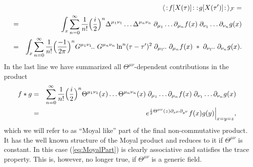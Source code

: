 \documentclass[a4paper,12pt]{article}
\let\bra=\langle        \let\ket=\rangle
\newcommand {\cF} {{\cal F}}
\begin{document}
\begin{eqnarray}
  \label{eq:MoyalContr}
  & &\bra\,:\!f[X(\tau)]\!: \; :\!g[X(\tau')]\!: \,\ket_{\cF} 
   = \nonumber\\
  &=&\int _x \sum _{n=0}^\infty 
             \frac 1{n!} \Bigl(\frac i2 \Bigr)^n
             \Delta^{\mu_1\nu_1} \ldots \Delta^{\mu_n\nu_n} \;
             \partial_{\mu_1} \ldots \partial_{\mu_n} f(x) \;
             \partial_{\nu_1} \ldots \partial_{\nu_n}g(x) \\
  &=&\int _x \sum _{n=0}^\infty 
             \frac 1{n!} \Bigl(\frac{-1}{2\pi}\Bigr)^n
             G^{\mu_1\nu_1}\!..~G^{\mu_n\nu_n} \ln^n(\tau - \tau')^2\;
             \partial_{\mu_1}\!..~\partial_{\mu_n} f(x) \; * \;
             \partial_{\nu_1}\!..~\partial_{\nu_n}g(x) . \nonumber
\end{eqnarray}
In the last line we have summarized all $\Theta^{\mu\nu}$-dependent 
contributions in the product
\begin{eqnarray}
  \label{eq:MoyalPart}
  f * g &=& \sum _{n=0}^\infty 
             \frac 1{n!} \Bigl(\frac i2 \Bigr)^n
             \Theta^{\mu_1\nu_1}(x) \ldots \Theta^{\mu_n\nu_n}(x) \;
             \partial_{\mu_1} \ldots \partial_{\mu_n} f(x) \;
             \partial_{\nu_1} \ldots \partial_{\nu_n}g(x) \nonumber\\
        &=& e^{\frac i2 \Theta^{\mu\nu}(z) \partial_{x^\mu}\partial_{y^\nu}} 
            f(x) g(y)\Bigr\vert_{x=y=z} ,
\end{eqnarray}
which we will refer to as ``Moyal like'' part of the final
non-commutative product. It has the well known structure of the Moyal product
and reduces to it if $\Theta^{\mu\nu}$ is constant.  
In this case (\ref{eq:MoyalPart}) is clearly associative and satisfies the 
trace property. This is, however, no longer true, if $\Theta^{\mu\nu}$ is a 
generic field.
\end{document}

